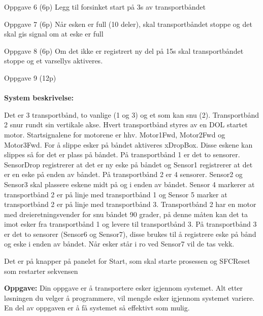 \vskip 10pt 
Oppgave 6 (6p) %
\vskip 2.5pt 
Legg til forsinket start på 3s av transportbåndet 

\vskip 10pt 
Oppgave 7 (6p) %
\vskip 2.5pt 
Når esken er full (10 deler), skal transportbåndet stoppe og det skal gis signal om at eske er full

\vskip 10pt 
Oppgave 8 (6p) %
\vskip 2.5pt 
Om det ikke er registrert ny del på 15s skal transportbåndet stoppe og et varsellys aktiveres. 
\vskip 1cm

\vskip 5pt 
\vskip 0.5cm


\vfil\eject
Oppgave 9 (12p) \\ %

\\[0.2cm]
\textbf{System beskrivelse:}

\vskip 10pt 
Det er 3 transportbånd, to vanlige (1 og 3) og et som kan snu (2). Transportbånd 2 snur rundt sin vertikale akse. Hvert transportbånd styres av en DOL startet motor. Startsignalene for motorene er hhv. Motor1Fwd, Motor2Fwd og Motor3Fwd. For å slippe esker på båndet aktiveres xDropBox. Disse eskene kan slippes så for det er plass på båndet. 
\vskip 10pt 
På transportbånd 1 er det to sensorer. SensorDrop registrerer at det er ny eske på båndet og Sensor1 registrerer at det er en eske på enden av båndet.
\vskip 10pt 
På transportbånd 2 er 4 sensorer. Sensor2 og Sensor3 skal plassere eskene midt på og i enden av båndet. Sensor 4 markerer at transportbånd 2 er på linje med transportbånd 1 og Sensor 5 marker at transportbånd 2 er på linje med transportbånd 3. Transportbånd 2 har en motor med dreieretningsvender for snu båndet 90 grader, på denne måten kan det ta imot esker fra transportbånd 1 og levere til transportbånd 3.
 \vskip 10pt 
På transportbånd 3 er det to sensorer (Sensor6 og Sensor7), disse brukes til å registrere eske på bånd og eske i enden av båndet. Når esker står i ro ved Sensor7 vil de tas vekk. 

\vskip 10pt 
Det er på knapper på panelet for Start, som skal starte prosessen og SFCReset som restarter sekvensen 

\vskip 10pt 
\textbf{Oppgave:}
\vskip 10pt 
Din oppgave er å transportere esker igjennom systemet. Alt etter løsningen du velger å programmere, vil mengde esker igjennom systemet variere. En del av oppgaven er å få systemet så effektivt som mulig. 

